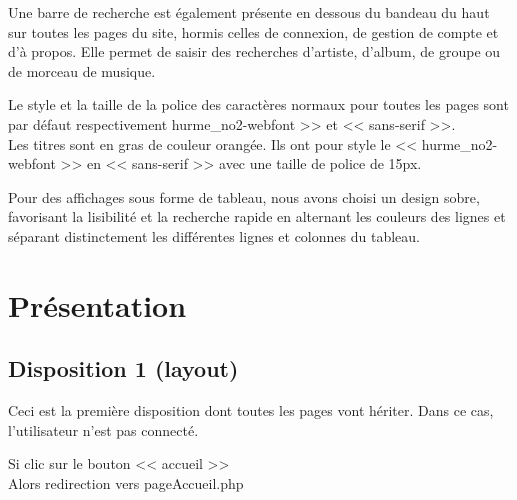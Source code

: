 \newpage

	\begin{paragraphe}
		Une barre de recherche est également présente en dessous du bandeau du haut sur toutes les pages du site, hormis celles de connexion, de gestion de compte et d'à propos.
		Elle permet de saisir des recherches d'artiste, d'album, de groupe ou de morceau de musique.
	\end{paragraphe}

	\begin{paragraphe}
		Le style et la taille de la police des caractères normaux pour toutes les pages sont par défaut respectivement \og hurme\_no2-webfont >> et << sans-serif >>.\\
		Les titres sont en gras de couleur orangée. Ils ont pour style le << hurme\_no2-webfont >> en << sans-serif >> avec une taille de police de 15px.
	\end{paragraphe}

    \begin{paragraphe}
       Pour des affichages sous forme de tableau, nous avons choisi un design sobre, favorisant la lisibilité et la recherche rapide en alternant les couleurs des lignes
       et séparant distinctement les différentes lignes et colonnes du tableau.
    \end{paragraphe}

\newpage

\section{Présentation}
	\subsection{Disposition 1 (layout)}

		\begin{paragraphe}
			Ceci est la première disposition dont toutes les pages vont hériter. Dans ce cas, l'utilisateur n'est pas connecté.
		\end{paragraphe}

		\begin{paragraphe}
			Si clic sur le bouton << accueil >> \\
			Alors redirection vers pageAccueil.php
		\end{paragraphe}

